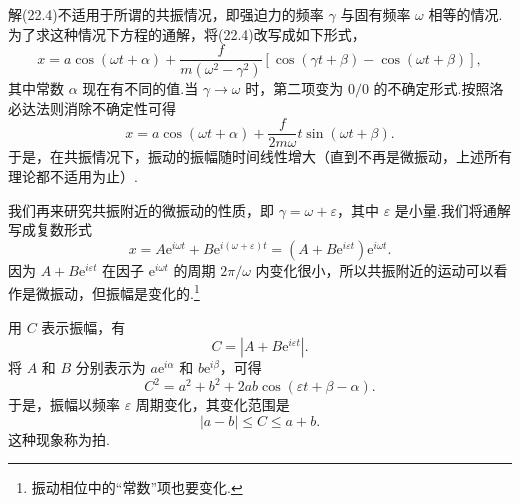 解(22.4)不适用于所谓的共振情况，即强迫力的频率 $\gamma$ 与固有频率 $\omega$ 相等的情况.为了求这种情况下方程的通解，将(22.4)改写成如下形式，
\begin{equation*}
  x=a\cos(\omega t+\alpha)
  +\frac{f}{m\left(\omega^2-\gamma^2\right)}
  \left[\cos(\gamma t+\beta)-\cos(\omega t+\beta)\right],
\end{equation*}
其中常数 $\alpha$ 现在有不同的值.当 $\gamma\to\omega$ 时，第二项变为 $0/0$ 的不确定形式.按照洛必达法则消除不确定性可得
\begin{equation}
  x=a\cos(\omega t+\alpha)+\frac{f}{2m\omega}t\sin(\omega t+\beta).
\end{equation}
于是，在共振情况下，振动的振幅随时间线性增大（直到不再是微振动，上述所有理论都不适用为止）.

我们再来研究共振附近的微振动的性质，即 $\gamma=\omega+\varepsilon$，其中 $\varepsilon$ 是小量.我们将通解写成复数形式
\begin{equation}
  x=A\mathrm{e}^{i\omega t}+B\mathrm{e}^{i(\omega+\varepsilon)t}
  =\left(A+B\mathrm{e}^{i\varepsilon t}\right)\mathrm{e}^{i\omega t}.
\end{equation}
因为 $A+B\mathrm{e}^{i\varepsilon t}$ 在因子 $\mathrm{e}^{i\omega t}$ 的周期 $2\pi/\omega$ 内变化很小，所以共振附近的运动可以看作是微振动，但振幅是变化的.\footnote{振动相位中的“常数”项也要变化.}

用 $C$ 表示振幅，有
\begin{equation*}
  C=\left|A+B\mathrm{e}^{i\varepsilon t}\right|.
\end{equation*}
将 $A$ 和 $B$ 分别表示为 $a\mathrm{e}^{i\alpha}$ 和 $b\mathrm{e}^{i\beta}$，可得
\begin{equation}
  C^2=a^2+b^2+2ab\cos(\varepsilon t+\beta-\alpha).
\end{equation}
于是，振幅以频率 $\varepsilon$ 周期变化，其变化范围是
\begin{equation*}
  |a-b|\leqslant C\leqslant a+b.
\end{equation*}
这种现象称为拍.

